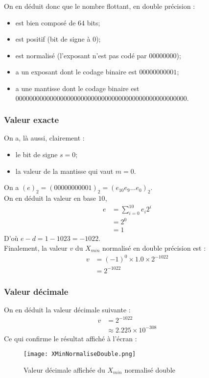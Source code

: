 \documentclass[a4paper, titlepage]{livret} %
\begin{document}
					On en déduit donc que le nombre flottant, en double précision :
					\begin{itemize}
						\item est bien composé de $64$ bits;
						\item est positif (bit de signe à 0);
						\item est normalisé (l'exposant n'est pas codé par $00000000$);
						\item a un exposant dont le codage binaire est $00000000001$;
						\item a une mantisse dont le codage binaire est $00000000 00000000 0000000 0000000 00000000 00000000 0000$.
					\end{itemize}

				\subsubsection{Valeur exacte}
					On a, là aussi, clairement : 
					\begin{itemize}
						\item le bit de signe $s = 0$;
						\item la valeur de la mantisse qui vaut $m = 0$.
					\end{itemize}
					On a $(e)_{2} = (00000000001)_{2} = (e_{10}e_{9}…e_{0})_{2}$.\\
					On en déduit la valeur en base $10$, 
					\[\begin{aligned}
						e & = \sum_{i=0}^{10} e_{i}2^{i}\\
						  & = 2^{0}\\
						  & = 1
					\end{aligned}\]
					D'où $e-d = 1 - 1023 = -1022$.\\
					Finalement, la valeur $v$ du $X_{min}$ normalisé en double précision est :
					\[\begin{aligned}
						v & = (-1)^{0} \times 1.0 \times 2^{-1022}\\
						  & = 2^{-1022}
					\end{aligned}\]

				\subsubsection{Valeur décimale}
					On en déduit la valeur décimale suivante :
					\[\begin{aligned}
						v & = 2^{-1022}\\
						  & \approx 2.225 \times 10^{-308}
					\end{aligned}\]
					Ce qui confirme le résultat affiché à l'écran :
					\begin{figure}[!h]
						\centering
  							\texttt{[image: XMinNormaliseDouble.png]}
  							\caption{Valeur décimale affichée du $X_{min}$ normalisé double}
					\end{figure}
			    	
\end{document}
